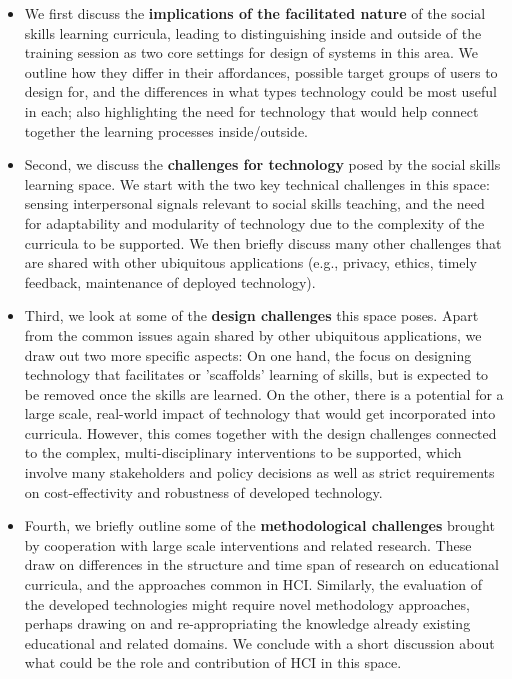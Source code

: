 \documentclass[prodmode,acmtochi]{acmsmall}
\begin{document}
\begin{itemize}
        \item We first discuss the {\bf implications of the facilitated nature} of the social skills learning curricula, leading to distinguishing inside and outside of the training session as two core settings for design of systems in this area. We outline how they differ in their affordances, possible target groups of users to design for, and the differences in what types technology could be most useful in each; also highlighting the need for technology that would help connect together the learning processes inside/outside. 
        \item Second, we discuss the {\bf challenges for technology} posed by the social skills learning space. We start with the two key technical challenges in this space: sensing interpersonal signals relevant to social skills teaching, and the need for adaptability and modularity of technology due to the complexity of the curricula to be supported. We then briefly discuss many other challenges that are shared with other ubiquitous applications (e.g., privacy, ethics, timely feedback, maintenance of deployed technology).  
        \item Third, we look at some of the {\bf design challenges} this space poses. Apart from the common issues again shared by other ubiquitous applications, we draw out two more specific aspects: On one hand, the focus on designing technology that facilitates or 'scaffolds' learning of skills, but is expected to be removed once the skills are learned. On the other, there is a potential for a large scale, real-world impact of technology that would get incorporated into curricula. However, this comes together with the design challenges connected to the complex, multi-disciplinary interventions to be supported, which involve many stakeholders and policy decisions as well as strict requirements on cost-effectivity and robustness of developed technology. 
        \item Fourth, we briefly outline some of the {\bf methodological challenges} brought by cooperation with large scale interventions and related research. These draw on differences in the structure and time span of research on educational curricula, and the approaches common in HCI. Similarly, the evaluation of the developed technologies might require novel methodology approaches, perhaps drawing on and re-appropriating the knowledge already existing educational and related domains. We conclude with a short discussion about what could be the role and contribution of HCI in this space.   
        
\end{itemize}
\end{document}
